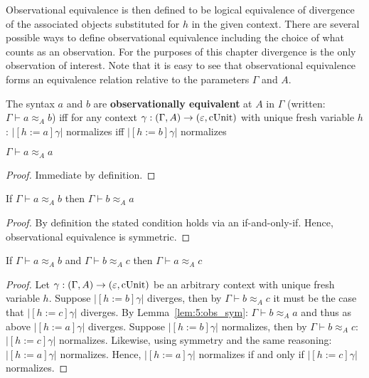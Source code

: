 Observational equivalence is then defined to be logical equivalence of divergence of the associated objects substituted for $h$ in the given context.
There are several possible ways to define observational equivalence including the choice of what counts as an observation.
For the purposes of this chapter divergence is the only observation of interest.
Note that it is easy to see that observational equivalence forms an equivalence relation relative to the parameters $\Gamma$ and $A$.

\begin{definition}
    The syntax $a$ and $b$ are \textbf{observationally equivalent} at $A$ in $\Gamma$ (written: $\Gamma \vdash a \approx_A b$) iff
    for any context $\gamma : (\Gamma, A) \to (\varepsilon, \textnormal{cUnit})$ with unique fresh variable $h$: $|[h := a]\gamma|$ normalizes iff $|[h := b]\gamma|$ normalizes
\end{definition}

\begin{lemma}
    \label{lem:5:obs_refl}
    $\Gamma \vdash a \approx_A a$
\end{lemma}
\begin{proof}
    Immediate by definition.
\end{proof}

\begin{lemma}
    \label{lem:5:obs_sym}
    If $\Gamma \vdash a \approx_A b$ then $\Gamma \vdash b \approx_A a$
\end{lemma}
\begin{proof}
    By definition the stated condition holds via an if-and-only-if.
    Hence, observational equivalence is symmetric.
\end{proof}

\begin{lemma}
    \label{lem:5:obs_trans}
    If $\Gamma \vdash a \approx_A b$ and $\Gamma \vdash b \approx_A c$ then $\Gamma \vdash a \approx_A c$
\end{lemma}
\begin{proof}
    Let $\gamma : (\Gamma, A) \to (\varepsilon, \textnormal{cUnit})$ be an arbitrary context with unique fresh variable $h$.
    Suppose $|[h := b]\gamma|$ diverges, then by $\Gamma \vdash b \approx_A c$ it must be the case that $|[h := c]\gamma|$ diverges.
    By Lemma~\ref{lem:5:obs_sym}: $\Gamma \vdash b \approx_A a$ and thus as above $|[h := a]\gamma|$ diverges.
    Suppose $|[h := b]\gamma|$ normalizes, then by $\Gamma \vdash b \approx_A c$: $|[h := c]\gamma|$ normalizes.
    Likewise, using symmetry and the same reasoning: $|[h := a]\gamma|$ normalizes.
    Hence, $|[h := a]\gamma|$ normalizes if and only if $|[h := c]\gamma|$ normalizes.
\end{proof}

